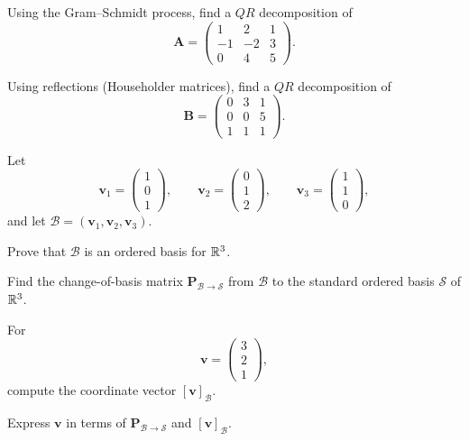 \begin{problem}
\begin{problemsubparts}
\item Using the Gram--Schmidt process, find a $QR$ decomposition of
\[
\mathbf A=
\begin{pmatrix}
1&2&1\\
-1&-2&3\\
0&4&5
\end{pmatrix}.
\]
\item Using reflections (Householder matrices), find a $QR$ decomposition of
\[
\mathbf B=
\begin{pmatrix}
0&3&1\\
0&0&5\\
1&1&1
\end{pmatrix}.
\]
\end{problemsubparts}
\end{problem}

\begin{problem}
Let
\[
\mathbf v_1=\begin{pmatrix}1\\0\\1\end{pmatrix},\qquad
\mathbf v_2=\begin{pmatrix}0\\1\\2\end{pmatrix},\qquad
\mathbf v_3=\begin{pmatrix}1\\1\\0\end{pmatrix},
\]
and let $\mathcal B=(\mathbf v_1,\mathbf v_2,\mathbf v_3)$.
\begin{problemsubparts}
\item Prove that $\mathcal B$ is an ordered basis for $\mathbb{R}^3$.
\item Find the change-of-basis matrix $\mathbf P_{\mathcal B\to\mathcal S}$ from $\mathcal B$ to the standard ordered basis $\mathcal S$ of $\mathbb{R}^3$.
\item For
\[
\mathbf v=\begin{pmatrix}3\\2\\1\end{pmatrix},
\]
compute the coordinate vector $[\mathbf v]_{\mathcal B}$.
\item Express $\mathbf v$ in terms of $\mathbf P_{\mathcal B\to\mathcal S}$ and $[\mathbf v]_{\mathcal B}$.
\end{problemsubparts}
\end{problem}

